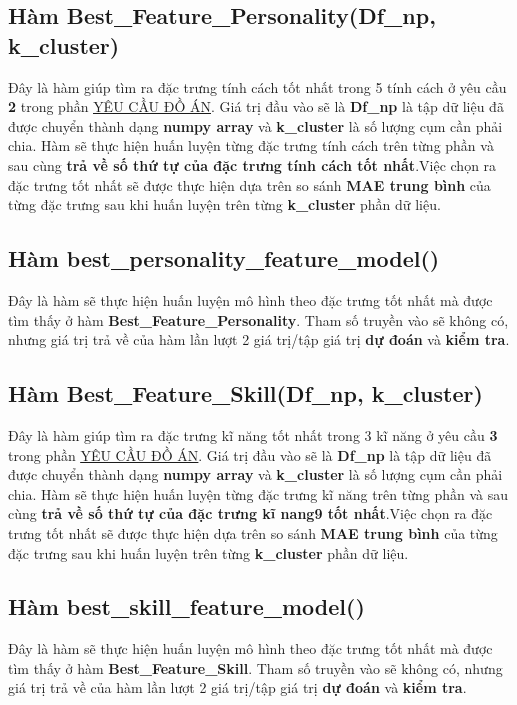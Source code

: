 \documentclass{report}
\begin{document}
\subsection{Hàm Best\_Feature\_Personality(Df\_np, k\_cluster)}
    Đây là hàm giúp tìm ra đặc trưng tính cách tốt nhất trong 5 tính cách ở yêu cầu \textbf{2} trong phần \hyperref[sec:requirement]{\underline{YÊU CẦU ĐỒ ÁN}}. Giá trị đầu vào sẽ là \textbf{Df\_np} là tập dữ liệu đã được chuyển thành dạng \textbf{numpy array} và \textbf{k\_cluster} là số lượng cụm cần phải chia. Hàm sẽ thực hiện huấn luyện từng đặc trưng tính cách trên từng phần và sau cùng \textbf{trả về số thứ tự của đặc trưng tính cách tốt nhất}.Việc chọn ra đặc trưng tốt nhất sẽ được thực hiện dựa trên so sánh \textbf{MAE trung bình} của từng đặc trưng sau khi huấn luyện trên từng \textbf{k\_cluster} phần dữ liệu.

\subsection{Hàm best\_personality\_feature\_model()}\label{sec:bestpersonalityfeaturemodel}
    Đây là hàm sẽ thực hiện huấn luyện mô hình theo đặc trưng tốt nhất mà được tìm thấy ở hàm \textbf{Best\_Feature\_Personality}. Tham số truyền vào sẽ không có, nhưng giá trị trả về của hàm lần lượt 2 giá trị/tập giá trị \textbf{dự đoán} và \textbf{kiểm tra}.

\subsection{Hàm Best\_Feature\_Skill(Df\_np, k\_cluster)}\label{sec:BestFeaturePersonality}
    Đây là hàm giúp tìm ra đặc trưng kĩ năng tốt nhất trong 3 kĩ năng ở yêu cầu \textbf{3} trong phần \hyperref[sec:requirement]{\underline{YÊU CẦU ĐỒ ÁN}}. Giá trị đầu vào sẽ là \textbf{Df\_np} là tập dữ liệu đã được chuyển thành dạng \textbf{numpy array} và \textbf{k\_cluster} là số lượng cụm cần phải chia. Hàm sẽ thực hiện huấn luyện từng đặc trưng kĩ năng trên từng phần và sau cùng \textbf{trả về số thứ tự của đặc trưng kĩ nang9 tốt nhất}.Việc chọn ra đặc trưng tốt nhất sẽ được thực hiện dựa trên so sánh \textbf{MAE trung bình} của từng đặc trưng sau khi huấn luyện trên từng \textbf{k\_cluster} phần dữ liệu.

\subsection{Hàm best\_skill\_feature\_model()}
    Đây là hàm sẽ thực hiện huấn luyện mô hình theo đặc trưng tốt nhất mà được tìm thấy ở hàm \textbf{Best\_Feature\_Skill}. Tham số truyền vào sẽ không có, nhưng giá trị trả về của hàm lần lượt 2 giá trị/tập giá trị \textbf{dự đoán} và \textbf{kiểm tra}.
\end{document}
